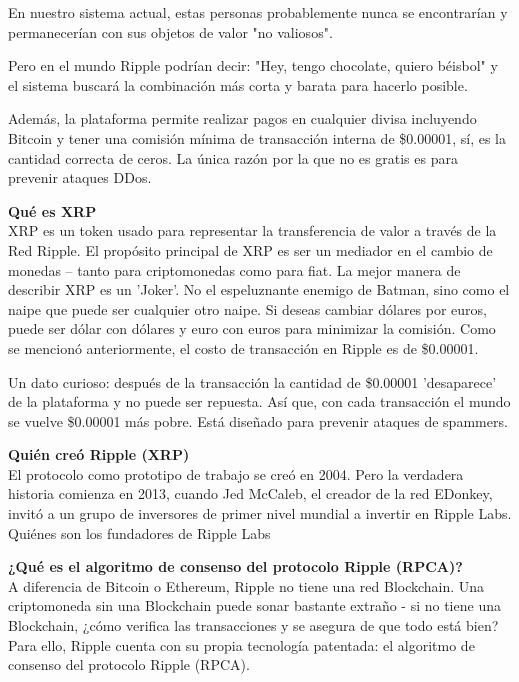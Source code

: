 \documentclass[a4paper,12pt]{/home/armando/Documentos/Cursos/LaTeX/Plantillas/lib/pub}
\begin{document}
	En nuestro sistema actual, estas personas probablemente nunca se encontrarían y permanecerían con sus objetos de valor "no valiosos".
	
	Pero en el mundo Ripple podrían decir: "Hey, tengo chocolate, quiero béisbol" y el sistema buscará la combinación más corta y barata para hacerlo posible.
	
	Además, la plataforma permite realizar pagos en cualquier divisa incluyendo Bitcoin y tener una comisión mínima de transacción interna de \$0.00001, sí, es la cantidad correcta de ceros. La única razón por la que no es gratis es para prevenir ataques DDos.
	
	\textbf{Qué es XRP}\\
	
	XRP es un token usado para representar la transferencia de valor a través de la Red Ripple. El propósito principal de XRP es ser un mediador en el cambio de monedas – tanto para criptomonedas como para fiat. La mejor manera de describir XRP es un 'Joker'. No el espeluznante enemigo de Batman, sino como el naipe que puede ser cualquier otro naipe. Si deseas cambiar dólares por euros, puede ser dólar con dólares y euro con euros para minimizar la comisión. Como se mencionó anteriormente, el costo de transacción en Ripple es de \$0.00001.
	
	Un dato curioso: después de la transacción la cantidad de \$0.00001 'desaparece' de la plataforma y no puede ser repuesta. Así que, con cada transacción el mundo se vuelve \$0.00001 más pobre. Está diseñado para prevenir ataques de spammers.
	
	\textbf{Quién creó Ripple (XRP)}\\
	
	El protocolo como prototipo de trabajo se creó en 2004.
	Pero la verdadera historia comienza en 2013, cuando Jed McCaleb, el creador de la red EDonkey, invitó a un grupo de inversores de primer nivel mundial a invertir en Ripple Labs.
	Quiénes son los fundadores de Ripple Labs
	
	\textbf{¿Qué es el algoritmo de consenso del protocolo Ripple (RPCA)?}\\
	
	A diferencia de Bitcoin o Ethereum, Ripple no tiene una red Blockchain. Una criptomoneda sin una Blockchain puede sonar bastante extraño - si no tiene una Blockchain, ¿cómo verifica las transacciones y se asegura de que todo está bien? Para ello, Ripple cuenta con su propia tecnología patentada: el algoritmo de consenso del protocolo Ripple (RPCA).
	
\end{document}
